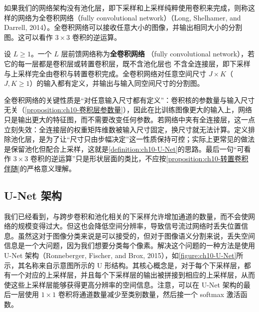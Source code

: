 \documentclass[../../main.tex]{subfiles}
\begin{document}
如果我们的网络架构没有池化层，即下采样和上采样纯粹使用卷积来完成，则称这样的网络为全卷积网络（fully convolutional network）（Long, Shelhamer, and Darrell, 2014）。全卷积网络可以接收任意大小的图像，并输出相同大小的分割图。这可以看作 $3\times 3$ 卷积的逆运算。

\begin{definition}[全卷积网络]\label{definition:ch10-全卷积网络}
设 $L\geqslant1$。一个 $L$ 层前馈网络称为\textbf{全卷积网络}
（fully convolutional network），若它的每一层都是卷积层或转置卷积层，既不含池化层也
不含全连接层，即下采样与上采样完全由卷积与转置卷积完成。全卷积网络对任意空间尺寸
$J\times K$（$J,K\geqslant1$）的输入都有定义，并输出与输入同空间尺寸的分割图。
\end{definition}

\begin{remark}
全卷积网络的关键性质是“对任意输入尺寸都有定义”：卷积核的参数量与输入尺寸无关（\cref{proposition:ch10-卷积层参数量}），因此在比训练图像更大的输入上，网络只是输出更大的特征图，而不需要改变任何参数。若网络中夹有全连接层，这一点立刻失效：全连接层的权重矩阵维数被输入尺寸固定，换尺寸就无法计算。定义排除池化层，是为了让“尺寸只由步幅决定”这一性质保持可控；实际上更常见的做法是保留池化但配合上采样，这就是\cref{definition:ch10-U-Net}的思路。最后一句“可看作 $3\times3$ 卷积的逆运算”只是形状层面的类比，不应按\cref{proposition:ch10-转置卷积伴随}的严格意义理解。
\end{remark}

\subsection{U-Net 架构}\label{subsection:ch10-U-Net架构}

我们已经看到，与跨步卷积和池化相关的下采样允许增加通道的数量，而不会使网络的规模变得过大。但这也会降低空间分辨率，导致信号流过网络时丢失位置信息。虽然这对于图像分类来说是可以接受的，但对于图像语义分割来说，丢失空间信息是一个大问题，因为我们想要分类每个像素。解决这个问题的一种方法是使用 U-Net 架构（Ronneberger, Fischer, and Brox, 2015），如\cref{figure:ch10-U-Net}所示，其名称来自示意图所示的 U 形结构。其核心概念是，对于每个下采样层，都有一个对应的上采样层，并且每个下采样层的输出被拼接到相应的上采样层，从而使这些上采样层能够获得更高分辨率的空间信息。注意，可以在 U-Net 架构的最后一层使用 $1\times 1$ 卷积将通道数量减少至类别数量，然后接一个 softmax 激活函数。
\end{document}
